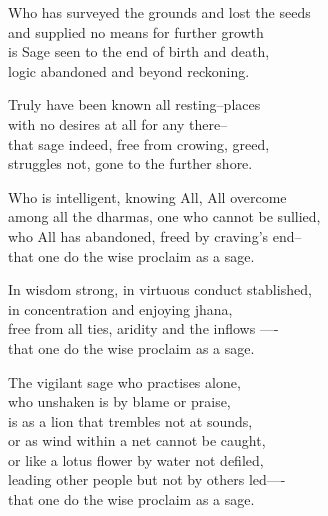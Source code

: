 \begin{MyDescription}{}
Who has surveyed the grounds and lost the seeds\\
and supplied no means for further growth\\
is Sage seen to the end of birth and death,\\
logic abandoned and beyond reckoning.
\end{MyDescription}

\begin{MyDescription}{}
Truly have been known all resting--places\\
with no desires at all for any there--\\
that sage indeed, free from crowing, greed,\\
struggles not, gone to the further shore.
\end{MyDescription}

\begin{MyDescription}{}
Who is intelligent, knowing All, All overcome\\
among all the dharmas, one who cannot be sullied,\\
who All has abandoned, freed by craving's end--\\
that one do the wise proclaim as a sage.
\end{MyDescription}

\begin{MyDescription}{}
In wisdom strong, in virtuous conduct stablished,\\
in concentration and enjoying jhana,\\
free from all ties, aridity and the inﬂows —-\\
that one do the wise proclaim as a sage.
\end{MyDescription}

\begin{MyDescription}{}
The vigilant sage who practises alone,\\
who unshaken is by blame or praise,\\
is as a lion that trembles not at sounds,\\
or as wind within a net cannot be caught,\\
or like a lotus ﬂower by water not deﬁled,\\
leading other people but not by others led—-\\
that one do the wise proclaim as a sage.
\end{MyDescription}

